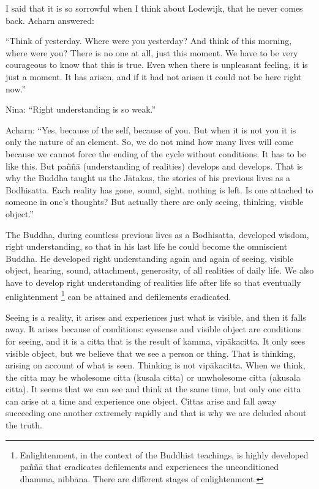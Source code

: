 I said that it is so sorrowful when I think about Lodewijk, that he
never comes back. Acharn answered:

``Think of yesterday. Where were you yesterday? And think of this
morning, where were you? There is no one at all, just this moment. We
have to be very courageous to know that this is true. Even when there is
unpleasant feeling, it is just a moment. It has arisen, and if it had
not arisen it could not be here right now.''

Nina: ``Right understanding is so weak.''

Acharn: ``Yes, because of the self, because of you. But when it is not
you it is only the nature of an element. So, we do not mind how many
lives will come because we cannot force the ending of the cycle without
conditions. It has to be like this. But paññā (understanding of
realities) develops and develops. That is why the Buddha taught us the
Jātakas, the stories of his previous lives as a Bodhisatta. Each reality
has gone, sound, sight, nothing is left. Is one attached to someone in
one's thoughts? But actually there are only seeing, thinking, visible
object.''

The Buddha, during countless previous lives as a Bodhisatta, developed
wisdom, right understanding, so that in his last life he could become
the omniscient Buddha. He developed right understanding again and again
of seeing, visible object, hearing, sound, attachment, generosity, of
all realities of daily life. We also have to develop right understanding
of realities life after life so that eventually enlightenment
\footnote{Enlightenment, in the context of
the Buddhist teachings, is highly developed paññā that eradicates
defilements and experiences the unconditioned dhamma, nibbāna. There are
different stages of enlightenment.}
can be attained and defilements eradicated.

Seeing is a reality, it arises and experiences just what is visible, and
then it falls away. It arises because of conditions: eyesense and
visible object are conditions for seeing, and it is a citta that is the
result of kamma, vipākacitta. It only sees visible object, but we
believe that we see a person or thing. That is thinking, arising on
account of what is seen. Thinking is not vipākacitta. When we think, the
citta may be wholesome citta (kusala citta) or unwholesome citta
(akusala citta). It seems that we can see and think at the same time,
but only one citta can arise at a time and experience one object. Cittas
arise and fall away succeeding one another extremely rapidly and that is
why we are deluded about the truth.

